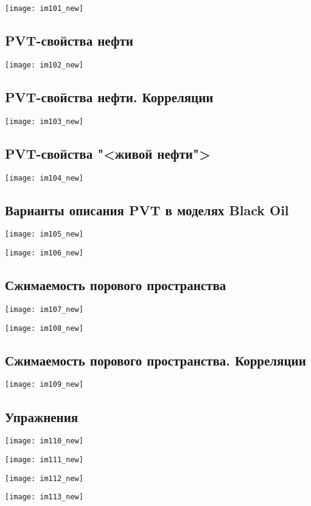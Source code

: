 \documentclass[main.tex]{subfiles}
\begin{document}
\texttt{[image: im101\_new]}

\subsection{PVT-свойства нефти}

\texttt{[image: im102\_new]}

\subsection{PVT-свойства нефти. Корреляции}

\texttt{[image: im103\_new]}

\subsection{PVT-свойства "<живой нефти">}

\texttt{[image: im104\_new]}

\subsection{Варианты описания PVT в моделях Black Oil}

\texttt{[image: im105\_new]}

\texttt{[image: im106\_new]}

\subsection{Сжимаемость порового пространства}

\texttt{[image: im107\_new]}

\texttt{[image: im108\_new]}

\subsection{Сжимаемость порового пространства. Корреляции}

\texttt{[image: im109\_new]}

\subsection{Упражнения}

\texttt{[image: im110\_new]}

\texttt{[image: im111\_new]}

\texttt{[image: im112\_new]}

\texttt{[image: im113\_new]}
\end{document}
